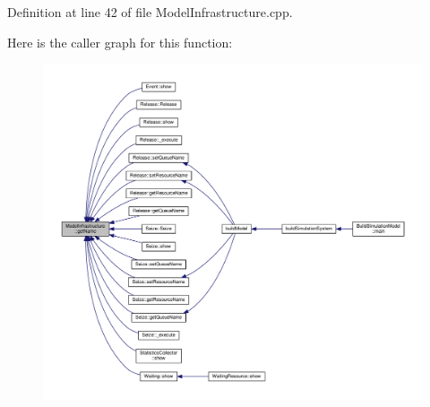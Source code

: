 Definition at line 42 of file Model\-Infrastructure.\-cpp.



Here is the caller graph for this function\-:
\nopagebreak
\begin{figure}[H]
\begin{center}
\leavevmode
\includegraphics[width=350pt]{class_model_infrastructure_ac06ca99d36c8d1a957697ef003e979b1_icgraph}
\end{center}
\end{figure}


